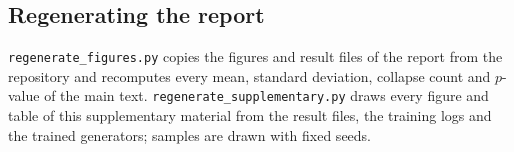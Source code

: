 \subsection{Regenerating the report}
\texttt{regenerate\_figures.py} copies the figures and result files of the report from the repository and recomputes every mean, standard deviation, collapse count and $p$-value of the main text. \texttt{regenerate\_supplementary.py} draws every figure and table of this supplementary material from the result files, the training logs and the trained generators; samples are drawn with fixed seeds.
